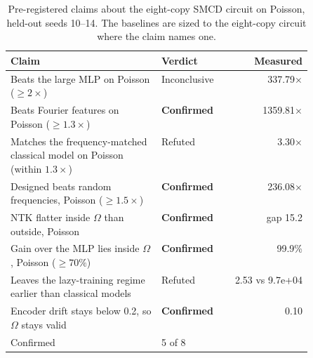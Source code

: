 \begin{table}[htbp]
  \centering
  \small
  \begin{tabular}{p{0.5\linewidth}lr}
  \toprule
  Claim & Verdict & Measured \\
  \midrule
  Beats the large MLP on Poisson ($\ge2\times$) & Inconclusive & 337.79$\times$ \\
  Beats Fourier features on Poisson ($\ge1.3\times$) & \textbf{Confirmed} & 1359.81$\times$ \\
  Matches the frequency-matched classical model on Poisson (within $1.3\times$) & Refuted & 3.30$\times$ \\
  Designed beats random frequencies, Poisson ($\ge1.5\times$) & \textbf{Confirmed} & 236.08$\times$ \\
  NTK flatter inside $\Omega$ than outside, Poisson & \textbf{Confirmed} & gap 15.2 \\
  Gain over the MLP lies inside $\Omega$, Poisson ($\ge70\%$) & \textbf{Confirmed} & 99.9\% \\
  Leaves the lazy-training regime earlier than classical models & Refuted & 2.53 vs 9.7e+04 \\
  Encoder drift stays below 0.2, so $\Omega$ stays valid & \textbf{Confirmed} & 0.10 \\
  \midrule
  Confirmed & 5 of 8 & \\
  \bottomrule
  \end{tabular}
  \caption{Pre-registered claims about the eight-copy SMCD circuit on Poisson, held-out seeds
    10--14. The baselines are sized to the eight-copy circuit where the claim names one.}
  \label{tab:ensemble}
\end{table}
